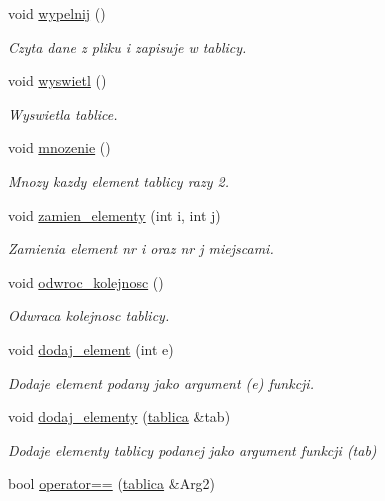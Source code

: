 \begin{DoxyCompactItemize}
\item 
void \hyperlink{classtablica_a2e787e39230c5bdcfa4a5b853f949021}{wypelnij} ()
\begin{DoxyCompactList}\small\item\em \-Czyta dane z pliku i zapisuje w tablicy. \end{DoxyCompactList}\item 
void \hyperlink{classtablica_a2b47856f4150aa2386a56b4aef8f8f5a}{wyswietl} ()
\begin{DoxyCompactList}\small\item\em \-Wyswietla tablice. \end{DoxyCompactList}\item 
void \hyperlink{classtablica_acb57cdc80f4bea556af98343d280419b}{mnozenie} ()
\begin{DoxyCompactList}\small\item\em \-Mnozy kazdy element tablicy razy 2. \end{DoxyCompactList}\item 
void \hyperlink{classtablica_a26a5a71d013d0284ff0f6b7648444a5e}{zamien\-\_\-elementy} (int i, int j)
\begin{DoxyCompactList}\small\item\em \-Zamienia element nr i oraz nr j miejscami. \end{DoxyCompactList}\item 
void \hyperlink{classtablica_aad3f11f312e1e3205049f5154c70c9e6}{odwroc\-\_\-kolejnosc} ()
\begin{DoxyCompactList}\small\item\em \-Odwraca kolejnosc tablicy. \end{DoxyCompactList}\item 
void \hyperlink{classtablica_aa1f8d3f1ac7cb8a60b305173adb1ef70}{dodaj\-\_\-element} (int e)
\begin{DoxyCompactList}\small\item\em \-Dodaje element podany jako argument (e) funkcji. \end{DoxyCompactList}\item 
void \hyperlink{classtablica_a1df0c5bb98c7a4eccc0cb1fa3662505d}{dodaj\-\_\-elementy} (\hyperlink{classtablica}{tablica} \&tab)
\begin{DoxyCompactList}\small\item\em \-Dodaje elementy tablicy podanej jako argument funkcji (tab) \end{DoxyCompactList}\item 
bool \hyperlink{classtablica_ac45dd9db8adea1f232a1a8b43c9459bd}{operator==} (\hyperlink{classtablica}{tablica} \&\-Arg2)

\end{DoxyCompactItemize}
